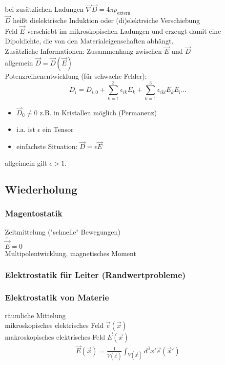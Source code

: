 \documentclass[a4paper]{article}
\begin{document}
bei zusätzlichen Ladungen $\vec{\nabla}\vec{D}=4\pi\rho_{\text{extern}}$\\
$\vec{D}$ heißt dielektrische Induktion oder (di)elektrsiche Verschiebung\\
Feld $\vec{E}$ verschiebt im mikroskopischen Ladungen und erzeugt damit eine
Dipoldichte, die von den Materialeigenschaften abhängt.\\
Zusätzliche Informationen: Zusammenhang zwischen $\vec{E}$ und $\vec{D}$\\
allgemein $\vec{D}=\vec{D}(\vec{E})$\\
Potenzreihenentwicklung (für schwache Felder):\\
\begin{equation}
D_i=D_{i,0}+\sum_{k=1}^3 \epsilon_{ik}E_k+\sum_{k=1}^3 \epsilon_{ikl}E_kE_l \ldots
\end{equation} 
\begin{itemize}
  \item $\vec{D}_0\neq0$ z.B. in Kristallen möglich (Permanenz)
  \item i.a. ist $\epsilon$ ein Tensor
  \item einfachste Situation: $\vec{D}=\epsilon\vec{E}$
\end{itemize}

allgeimein gilt $\epsilon>1$.

\subsection{Wiederholung}
\subsubsection{Magentostatik}
Zeitmittelung ("schnelle" Bewegungen)\\
$\bar{\dot{\vec{E}}}=0$\\
Multipolentwicklung, magnetisches Moment\\
\subsubsection{Elektrostatik für Leiter (Randwertprobleme)}
\subsubsection{Elektrostatik von Materie}
räumliche Mittelung\\
mikroskopisches elektrisches Feld $\vec{e}(\vec{x})$\\
makroskopisches elektrisches Feld $\vec{E}(\vec{x})$\\
\begin{align}
\vec{E}(\vec{x})=\frac{1}{V(\vec{x})}\int_{V(\vec{x})} d^3x' \vec{e}(\vec{x}')
\end{align}
\end{document}
